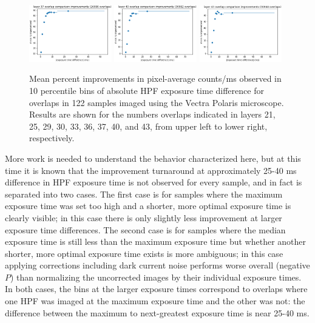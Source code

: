 \documentclass[letterpaper,11pt]{article}
\begin{document}
\begin{figure}[!ht]
\includegraphics[width=0.32\textwidth]{images/results/improvements_by_layer_polaris/layer_37_improvements_polaris}
\includegraphics[width=0.32\textwidth]{images/results/improvements_by_layer_polaris/layer_40_improvements_polaris}
\includegraphics[width=0.32\textwidth]{images/results/improvements_by_layer_polaris/layer_43_improvements_polaris}
\caption{\footnotesize Mean percent improvements in pixel-average counts/ms observed in 10 percentile bins of absolute HPF exposure time difference for overlaps in 122 samples imaged using the Vectra Polaris microscope. Results are shown for the numbers overlaps indicated in layers 21, 25, 29, 30, 33, 36, 37, 40, and 43, from upper left to lower right, respectively.}
\label{fig:improvements_as_exposure_time_layers_polaris_2}
\end{figure}

More work is needed to understand the behavior characterized here, but at this time it is known that the improvement turnaround at approximately 25-40 ms difference in HPF exposure time is not observed for every sample, and in fact is separated into two cases. The first case is for samples where the maximum exposure time was set too high and a shorter, more optimal exposure time is clearly visible; in this case there is only slightly less improvement at larger exposure time differences. The second case is for samples where the median exposure time is still less than the maximum exposure time but whether another shorter, more optimal exposure time exists is more ambiguous; in this case applying corrections including dark current noise performs worse overall (negative $P$) than normalizing the uncorrected images by their individual exposure times. In both cases, the bins at the larger exposure times correspond to overlaps where one HPF was imaged at the maximum exposure time and the other was not: the difference between the maximum to next-greatest exposure time is near 25-40 ms. 
\end{document}
